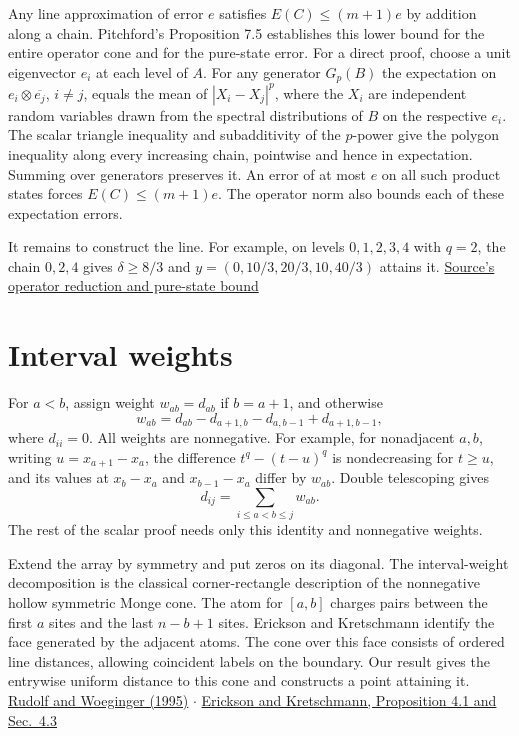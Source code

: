 \documentclass[11pt]{article}
\begin{document}
Any line approximation of error $e$ satisfies $E(C)\leq (m+1)e$ by addition along a chain. Pitchford's Proposition 7.5 establishes this lower bound for the entire operator cone and for the pure-state error. For a direct proof, choose a unit eigenvector $e_i$ at each level of $A$. For any generator $G_p(B)$ the expectation on $e_i\otimes\overline{e_j}$, $i\ne j$, equals the mean of $|X_i-X_j|^p$, where the $X_i$ are independent random variables drawn from the spectral distributions of $B$ on the respective $e_i$. The scalar triangle inequality and subadditivity of the $p$-power give the polygon inequality along every increasing chain, pointwise and hence in expectation. Summing over generators preserves it. An error of at most $e$ on all such product states forces $E(C)\leq(m+1)e$. The operator norm also bounds each of these expectation errors.

It remains to construct the line. For example, on levels $0,1,2,3,4$ with $q=2$, the chain $0,2,4$ gives $\delta\geq 8/3$ and $y=(0,10/3,20/3,10,40/3)$ attains it. \href{https://github.com/ipitchford/quantum-transport-cost-cones/blob/270f5dba795ffd73d271bfde959237b730227c5e/manuscript.tex\#L521-L532}{Source's operator reduction and pure-state bound}

\section{Interval weights}

For $a<b$, assign weight $w_{ab}=d_{ab}$ if $b=a+1$, and otherwise
\[
 w_{ab}=d_{ab}-d_{a+1,b}-d_{a,b-1}+d_{a+1,b-1},
\]
where $d_{ii}=0$. All weights are nonnegative. For example, for nonadjacent $a,b$, writing $u=x_{a+1}-x_a$, the difference $t^q-(t-u)^q$ is nondecreasing for $t\geq u$, and its values at $x_b-x_a$ and $x_{b-1}-x_a$ differ by $w_{ab}$. Double telescoping gives
\[
 d_{ij}=\sum_{i\le a<b\le j}w_{ab}.
\]
The rest of the scalar proof needs only this identity and nonnegative weights.

Extend the array by symmetry and put zeros on its diagonal. The interval-weight decomposition is the classical corner-rectangle description of the nonnegative hollow symmetric Monge cone. The atom for $[a,b]$ charges pairs between the first $a$ sites and the last $n-b+1$ sites. Erickson and Kretschmann identify the face generated by the adjacent atoms. The cone over this face consists of ordered line distances, allowing coincident labels on the boundary. Our result gives the entrywise uniform distance to this cone and constructs a point attaining it. \href{https://doi.org/10.1007/BF01415751}{Rudolf and Woeginger (1995)} \ensuremath{\cdot} \href{https://arxiv.org/html/2311.07522v2\#S4}{Erickson and Kretschmann, Proposition 4.1 and Sec.~4.3}
\end{document}
